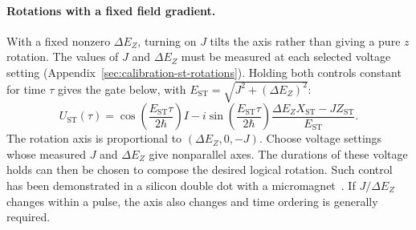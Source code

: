 \paragraph{Rotations with a fixed field gradient.}
With a fixed nonzero $\Delta E_Z$, turning on $J$ tilts the axis
rather than giving a pure $z$ rotation. The values of $J$ and
$\Delta E_Z$ must be measured at each selected voltage setting
(Appendix~\ref{sec:calibration-st-rotations}). Holding both controls
constant for time $\tau$ gives the gate below, with
$E_{\mathrm{ST}}=\sqrt{J^2+(\Delta E_Z)^2}$:
\begin{equation}
  U_{\mathrm{ST}}(\tau)
   =\cos\!\left(\frac{E_{\mathrm{ST}}\tau}{2\hbar}\right)I
    -i\sin\!\left(\frac{E_{\mathrm{ST}}\tau}{2\hbar}\right)
       \frac{\Delta E_Z X_{\mathrm{ST}}-JZ_{\mathrm{ST}}}
            {E_{\mathrm{ST}}}.
  \label{eq:st-pulse-rotation}
\end{equation}
The rotation axis is proportional to $(\Delta E_Z,0,-J)$.
Choose voltage settings whose measured $J$ and $\Delta E_Z$ give
nonparallel axes. The durations of these voltage
holds can then be chosen to compose the desired logical rotation.
Such control has been demonstrated in a silicon double dot with a
micromagnet~\cite{Wu2014}.
If $J/\Delta E_Z$ changes within a pulse, the axis also changes
and time ordering is generally required.

